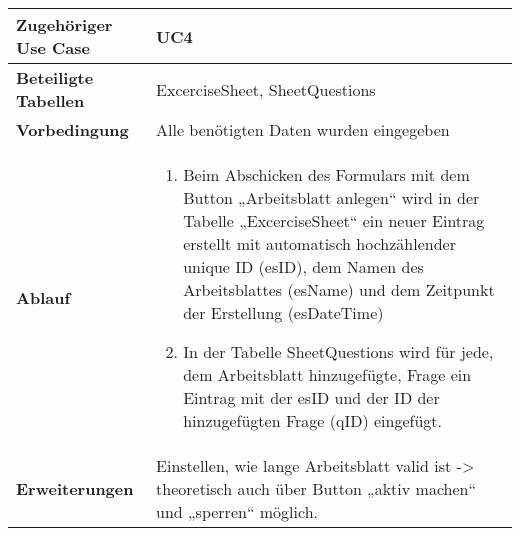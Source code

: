 \begin{table}[h]
	\begin{tabular}{|p{3cm}|p{11.06cm}|}
	\hline
		\textbf{Zugehöriger Use Case}                 &    UC4     \\ \hline
		\textbf{Beteiligte Tabellen}      &    ExcerciseSheet, SheetQuestions     \\ \hline
		\textbf{Vorbedingung}              &    Alle benötigten Daten wurden eingegeben     \\ \hline
		\textbf{Ablauf}              &   
			\begin{enumerate}
			  \item Beim Abschicken des Formulars mit dem Button „Arbeitsblatt anlegen“ wird in der Tabelle „ExcerciseSheet“ ein neuer Eintrag erstellt mit automatisch hochzählender unique ID (esID), dem Namen des Arbeitsblattes (esName) und dem Zeitpunkt der Erstellung (esDateTime)
			  \item In der Tabelle SheetQuestions wird für jede, dem Arbeitsblatt hinzugefügte, Frage ein Eintrag mit der esID und der ID der hinzugefügten Frage (qID)  eingefügt.
			\end{enumerate}
		\\ \hline
		\textbf{Erweiterungen}              &     Einstellen, wie lange Arbeitsblatt valid ist -> theoretisch auch über Button „aktiv machen“ und „sperren“ möglich.    \\ \hline
	\end{tabular}
\end{table}\FloatBarrier


